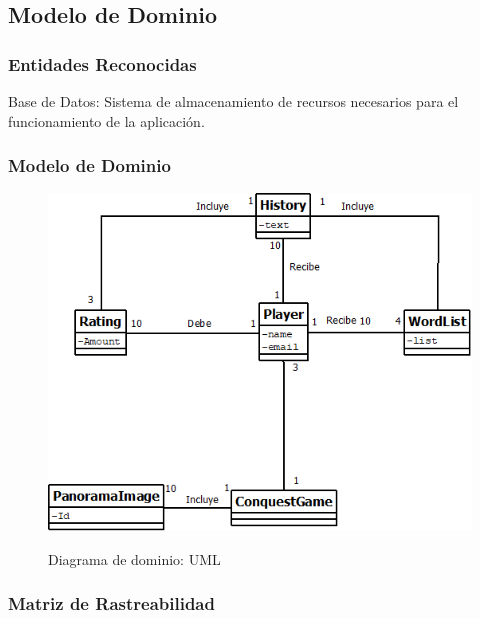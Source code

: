 \subsection{Modelo de Dominio}
\subsubsection{Entidades Reconocidas}
Base de Datos: Sistema de almacenamiento de recursos necesarios para el funcionamiento de la aplicación.
\subsubsection{Modelo de Dominio}
\begin{figure}[H]
\centering
   \includegraphics[scale=0.5]{imgs/ModeloDominio.png}
   \begin{center}
   Diagrama de dominio: UML
   \end{center}
\end{figure}
\subsubsection{Matriz de Rastreabilidad}